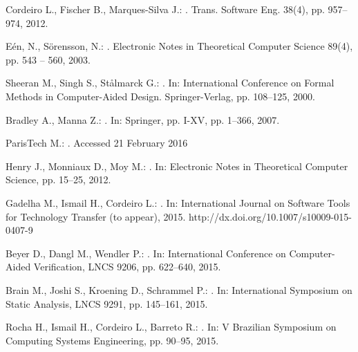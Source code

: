 \documentclass{acm_sen_article}
\begin{document}
{{\begin{thebibliography}{1}
Cordeiro L., Fischer B., Marques{-}Silva J.:
.
 Trans. Software Eng. 38(4), pp. 957--974, 2012.

E{\'{e}}n, N., S{\"{o}}rensson, N.:
.
\newblock Electronic Notes in Theoretical Computer Science 89(4), pp. 543 -- 560, 2003.

Sheeran M., Singh S., St{\aa}lmarck G.:
.
\newblock In: International Conference on Formal Methods in Computer-Aided Design. Springer-Verlag, pp. 108--125, 2000.

Bradley A., Manna Z.:
. 
\newblock In: Springer, pp. I-XV, pp. 1--366, 2007.

ParisTech M.:
. 
\newblock Accessed 21 February 2016

Henry J., Monniaux D., Moy M.: 
. 
\newblock In: Electronic Notes in Theoretical Computer Science, pp. 15--25, 2012.

Gadelha M., Ismail H., Cordeiro L.:
.
\newblock In: International Journal on Software Tools for Technology Transfer (to appear), 2015.
\newblock http://dx.doi.org/10.1007/s10009-015-0407-9

Beyer D., Dangl M., Wendler P.:
.
\newblock In: International Conference on Computer-Aided Verification, LNCS 9206, pp. 622--640, 2015.

Brain M., Joshi S., Kroening D., Schrammel P.:
.
\newblock In: International Symposium on Static Analysis, LNCS 9291, pp. 145--161, 2015.

Rocha H., Ismail H., Cordeiro L., Barreto R.:
.
\newblock In: V Brazilian Symposium on Computing Systems Engineering, pp. 90--95, 2015.


\end{thebibliography}}}
\end{document}
